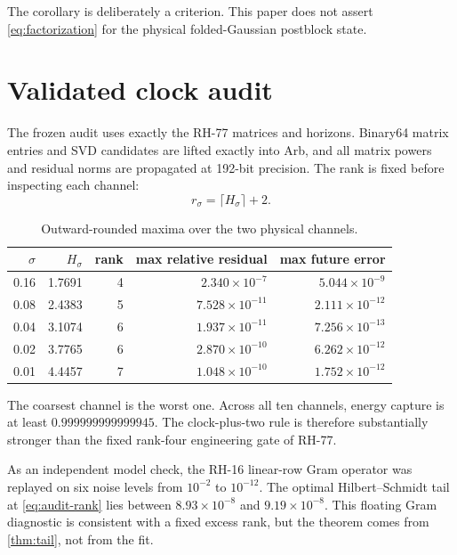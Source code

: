 \documentclass[11pt]{article}
\theoremstyle{remark}
\begin{document}
The corollary is deliberately a criterion.  This paper does not assert
\eqref{eq:factorization} for the physical folded-Gaussian postblock state.

\section{Validated clock audit}

The frozen audit uses exactly the RH-77 matrices and horizons.  Binary64
matrix entries and SVD candidates are lifted exactly into Arb, and all matrix
powers and residual norms are propagated at 192-bit precision.  The rank is
fixed before inspecting each channel:
\begin{equation}
 r_\sigma=\lceil H_\sigma\rceil+2.
 \label{eq:audit-rank}
\end{equation}

\begin{table}[ht]
\centering
\small
\begin{tabular}{rrrrr}
\toprule
$\sigma$ & $H_\sigma$ & rank & max relative residual & max future error\\
\midrule
0.16 & 1.7691 & 4 & $2.340\times10^{-7}$ & $5.044\times10^{-9}$\\
0.08 & 2.4383 & 5 & $7.528\times10^{-11}$ & $2.111\times10^{-12}$\\
0.04 & 3.1074 & 6 & $1.937\times10^{-11}$ & $7.256\times10^{-13}$\\
0.02 & 3.7765 & 6 & $2.870\times10^{-10}$ & $6.262\times10^{-12}$\\
0.01 & 4.4457 & 7 & $1.048\times10^{-10}$ & $1.752\times10^{-12}$\\
\bottomrule
\end{tabular}
\caption{Outward-rounded maxima over the two physical channels.}
\label{tab:audit}
\end{table}

The coarsest channel is the worst one.  Across all ten channels, energy
capture is at least $0.999999999999945$.  The clock-plus-two rule is therefore
substantially stronger than the fixed rank-four engineering gate of RH-77.

As an independent model check, the RH-16 linear-row Gram operator was replayed
on six noise levels from $10^{-2}$ to $10^{-12}$.  The optimal
Hilbert--Schmidt tail at \eqref{eq:audit-rank} lies between
$8.93\times10^{-8}$ and $9.19\times10^{-8}$.  This floating Gram diagnostic
is consistent with a fixed excess rank, but the theorem comes from
\cref{thm:tail}, not from the fit.
\end{document}
